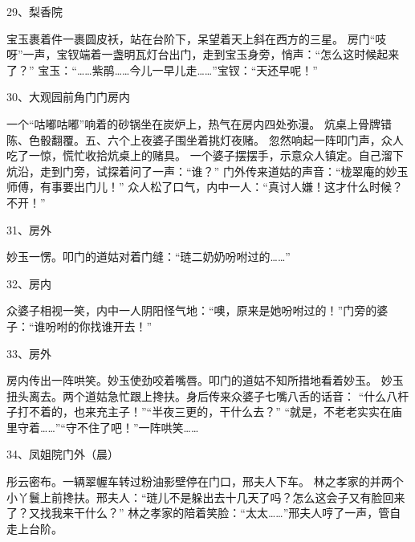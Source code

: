 29、梨香院\par
宝玉裹着件一裹圆皮袄，站在台阶下，呆望着天上斜在西方的三星。
房门“吱呀”一声，宝钗端着一盏明瓦灯台出门，走到宝玉身旁，悄声：“怎么这时候起来了？”
宝玉：“……紫鹃……今儿一早儿走……”宝钗：“天还早呢！”

30、大观园前角门门房内\par
一个“咕嘟咕嘟”响着的砂锅坐在炭炉上，热气在房内四处弥漫。
炕桌上骨牌错陈、色骰翻覆。五、六个上夜婆子围坐着挑灯夜赌。
忽然响起一阵叩门声，众人吃了一惊，慌忙收拾炕桌上的赌具。
一个婆子摆摆手，示意众人镇定。自己溜下炕沿，走到门旁，试探着问了一声：“谁？”
门外传来道姑的声音：“栊翠庵的妙玉师傅，有事要出门儿！”
众人松了口气，内中一人：“真讨人嫌！这才什么时候？不开！”

31、房外\par
妙玉一愣。叩门的道姑对着门缝：“琏二奶奶吩咐过的……”

32、房内\par
众婆子相视一笑，内中一人阴阳怪气地：“噢，原来是她吩咐过的！”门旁的婆子：“谁吩咐的你找谁开去！”

33、房外\par
房内传出一阵哄笑。妙玉使劲咬着嘴唇。叩门的道姑不知所措地看着妙玉。
妙玉扭头离去。两个道姑急忙跟上搀扶。身后传来众婆子七嘴八舌的话音：
“什么八杆子打不着的，也来充主子！”“半夜三更的，干什么去？”
“就是，不老老实实在庙里守着……”“守不住了吧！”一阵哄笑……

34、凤姐院门外（晨）\par
彤云密布。一辆翠幄车转过粉油影壁停在门口，邢夫人下车。
林之孝家的并两个小丫鬟上前搀扶。邢夫人：“琏儿不是躲出去十几天了吗？怎么这会子又有脸回来了？又找我来干什么？”
林之孝家的陪着笑脸：“太太……”邢夫人哼了一声，管自走上台阶。

